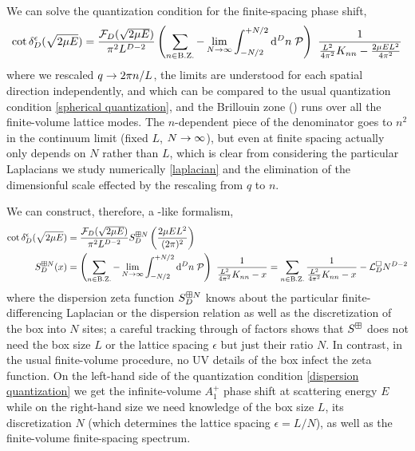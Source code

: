 We can solve the quantization condition for the finite-spacing phase shift,
\begin{align}
    \cot \delta_D^\epsilon(\sqrt{2 \mu E})
    =
    \frac{\mathcal{F}_D(\sqrt{2 \mu E})}{\pi^2 L^{D-2}}
    \left(\sum_{n\in\text{B.Z.}} - \lim_{N\rightarrow\infty}\int_{-N/2}^{+N/2} \mathrm{d}^D n\; \mathcal{P} \right)\  \frac{1}{\frac{L^2}{4\pi^2} K_{nn}-\frac{2\mu E L^2}{4\pi^2}}
\end{align}
where we rescaled $q\rightarrow 2\pi n/L$, the limits are understood for each spatial direction independently, and which can be compared to the usual quantization condition \eqref{spherical quantization}, and the Brillouin zone (\BZ) runs over all the finite-volume lattice modes.
The $n$-dependent piece of the denominator goes to $n^2$ in the continuum limit (fixed $L$, $N\rightarrow\infty$), but even at finite spacing actually only depends on $N$ rather than $L$, which is clear from considering the particular Laplacians we study numerically \eqref{laplacian} and the elimination of the dimensionful scale effected by the rescaling from $q$ to $n$.

We can construct, therefore, a \Luscher-like formalism,
\begin{align}
    \label{eq:dispersion quantization}
    \cot \delta_D^{\epsilon}( \sqrt{2 \mu E} ) &= \frac{\mathcal{F}_D(\sqrt{2 \mu E})}{\pi^2 L^{D-2}} S^{\boxplus N}_{D}\left(\frac{2\mu E L^2}{(2\pi)^2}\right)
    \\
    \label{eq:dispersion S}
    S^{\boxplus N}_{D}( x )
    &=
    \left(\sum_{n\in\text{B.Z.}} - \lim_{N\rightarrow\infty}\int_{-N/2}^{+N/2} \mathrm{d}^D n\; \mathcal{P} \right)\  \frac{1}{ \frac{L^2}{4\pi^2}K_{nn} - x} = \sum_{n\in\text{B.Z.}}\frac{1}{ \frac{L^2}{4\pi^2}K_{nn} - x} - \mathcal{L}_D^{\square}N^{D-2}
\end{align}
where the dispersion zeta function $S^{\boxplus N}_{D}$ knows about the particular finite-differencing Laplacian or the dispersion relation as well as the discretization of the box into $N$ sites; a careful tracking through of factors shows that $S^{\boxplus}$ does not need the box size $L$ or the lattice spacing $\epsilon$ but just their ratio $N$.
In contrast, in the usual finite-volume procedure, no UV details of the box infect the zeta function.
On the left-hand side of the quantization condition \eqref{dispersion quantization} we get the infinite-volume $A_1^+$ phase shift at scattering energy $E$ while on the right-hand size we need knowledge of the box size $L$, its discretization $N$ (which determines the lattice spacing $\epsilon=L/N$), as well as the finite-volume finite-spacing spectrum.

